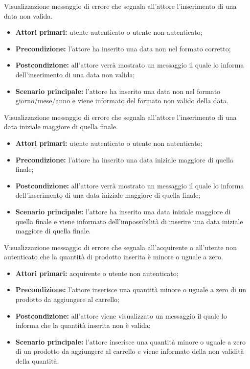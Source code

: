 Visualizzazione messaggio di errore che segnala all'attore l'inserimento di una data non valida.
\begin{itemize}
    \item \textbf{Attori primari:} utente autenticato o utente non autenticato;
    \item \textbf{Precondizione:} l'attore ha inserito una data non nel formato corretto;
    \item \textbf{Postcondizione:} all'attore verrà mostrato un messaggio il quale lo informa dell'inserimento di una data non valida;
    \item \textbf{Scenario principale:} l'attore ha inserito una data non nel formato giorno/mese/anno e viene informato del formato non valido della data.
\end{itemize}

Visualizzazione messaggio di errore che segnala all'attore l'inserimento di una data iniziale maggiore di quella finale.
\begin{itemize}
    \item \textbf{Attori primari:} utente autenticato o utente non autenticato;
    \item \textbf{Precondizione:} l'attore ha inserito una data iniziale maggiore di quella finale;
    \item \textbf{Postcondizione:} all'attore verrà mostrato un messaggio il quale lo informa dell'inserimento di una data iniziale maggiore di quella finale;
    \item \textbf{Scenario principale:} l'attore ha inserito una data iniziale maggiore di quella finale e viene informato dell'impossibilità di inserire una data iniziale maggiore di quella finale.
\end{itemize}

Visualizzazione messaggio di errore che segnala all'acquirente o all'utente non autenticato che la quantità di prodotto inserita è minore o uguale a zero.
\begin{itemize}
    \item \textbf{Attori primari:} acquirente o utente non autenticato;
    \item \textbf{Precondizione:} l'attore inserisce una quantità minore o uguale a zero di un prodotto da aggiungere al carrello;
    \item \textbf{Postcondizione:} all'attore viene visualizzato un messaggio il quale lo informa che la quantità inserita non è valida;
    \item \textbf{Scenario principale:} l'attore inserisce una quantità minore o uguale a zero di un prodotto da aggiungere al carrello e viene informato della non validità della quantità.
\end{itemize}

